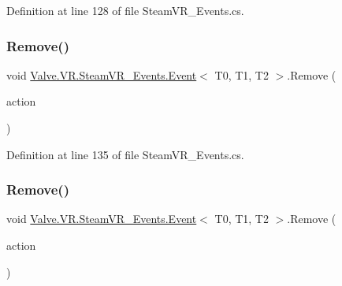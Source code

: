 Definition at line 128 of file Steam\+V\+R\+\_\+\+Events.\+cs.

\mbox{\label{class_valve_1_1_v_r_1_1_steam_v_r___events_1_1_event_ae05966f336e6fa7a5bcc864b4e9cb6b8}} 
\subsubsection{\texorpdfstring{Remove()}{Remove()}\hspace{0.1cm}{\footnotesize\ttfamily [3/4]}}
{\footnotesize\ttfamily void \mbox{\hyperlink{class_valve_1_1_v_r_1_1_steam_v_r___events_1_1_event}{Valve.\+V\+R.\+Steam\+V\+R\+\_\+\+Events.\+Event}}$<$ T0, T1, T2 $>$.Remove (\begin{DoxyParamCaption}\item[{Unity\+Action$<$ T0, T1 $>$}]{action }\end{DoxyParamCaption})}



Definition at line 135 of file Steam\+V\+R\+\_\+\+Events.\+cs.

\mbox{\label{class_valve_1_1_v_r_1_1_steam_v_r___events_1_1_event_a6bf82abbd94b3d724e1feaec30063637}} 
\subsubsection{\texorpdfstring{Remove()}{Remove()}\hspace{0.1cm}{\footnotesize\ttfamily [4/4]}}
{\footnotesize\ttfamily void \mbox{\hyperlink{class_valve_1_1_v_r_1_1_steam_v_r___events_1_1_event}{Valve.\+V\+R.\+Steam\+V\+R\+\_\+\+Events.\+Event}}$<$ T0, T1, T2 $>$.Remove (\begin{DoxyParamCaption}\item[{Unity\+Action$<$ T0, T1, T2 $>$}]{action }\end{DoxyParamCaption})}



